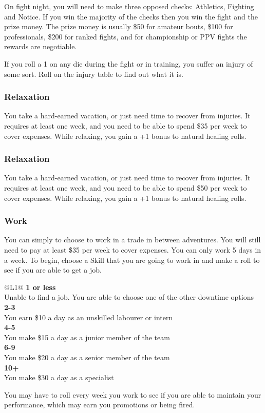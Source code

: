 On fight night, you will need to make three opposed checks: Athletics, Fighting and Notice. If you win the majority of the checks then you win the fight and the prize money. The prize money is usually \$50 for amateur bouts, \$100 for professionals, \$200 for ranked fights, and for championship or PPV fights the rewards are negotiable.

If you roll a 1 on any die during the fight or in training, you suffer an injury of some sort. Roll on the injury table to find out what it is.

\subsubsection{Relaxation}

You take a hard-earned vacation, or just need time to recover from injuries. It requires at least one week, and you need to be able to spend \$35 per week to cover expenses. While relaxing, you gain a +1 bonus to natural healing rolls.

\subsubsection{Relaxation}

You take a hard-earned vacation, or just need time to recover from injuries. It requires at least one week, and you need to be able to spend \$50 per week to cover expenses. While relaxing, you gain a +1 bonus to natural healing rolls.

\subsubsection{Work}

You can simply to choose to work in a trade in between adventures. You will still need to pay at least \$35 per week to cover expenses. You can only work 5 days in a week. To begin, choose a Skill that you are going to work in and make a roll to see if you are able to get a job.

\begin{redtable}{\linewidth}{@{}L{1}@{}}
\textbf{1 or less}\\
Unable to find a job. You are able to choose one of the other downtime options\\
\textbf{2-3}\\
You earn \$10 a day as an unskilled labourer or intern\\
\textbf{4-5}\\
You make \$15 a day as a junior member of the team\\
\textbf{6-9}\\
You make \$20 a day as a senior member of the team\\
\textbf{10+}\\
You make \$30 a day as a specialist\\
\end{redtable}

You may have to roll every week you work to see if you are able to maintain your performance, which may earn you promotions or being fired. 
